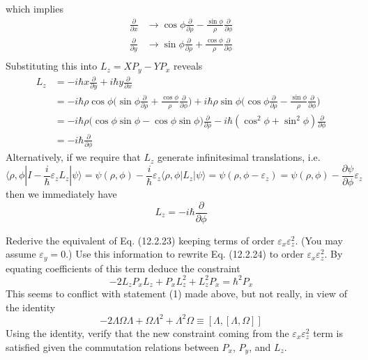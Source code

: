 \documentclass[../principles-of-quantum-mechanics.tex]{subfiles}
\begin{document}
\begin{questions}
\begin{solution}
		which implies
		\begin{align*}
			\frac{\partial}{\partial x} &\to \cos\phi\frac{\partial}{\partial \rho} - \frac{\sin\phi}{\rho}\frac{\partial}{\partial \phi} \\
			\frac{\partial}{\partial y} &\to \sin\phi\frac{\partial}{\partial \rho} + \frac{\cos\phi}{\rho}\frac{\partial}{\partial \phi} \\
		\end{align*}
		Substituting this into $L_z = XP_y - YP_x$ reveals
		\begin{align*}
			L_z &= -i\hbar x\frac{\partial}{\partial y} + i\hbar y\frac{\partial}{\partial x} \\
			&= -i\hbar\rho\cos\phi\Big(\sin\phi\frac{\partial}{\partial \rho} + \frac{\cos\phi}{\rho}\frac{\partial}{\partial \phi}\Big) + i\hbar\rho\sin\phi\Big(\cos\phi\frac{\partial}{\partial \rho} - \frac{\sin\phi}{\rho}\frac{\partial}{\partial \phi}\Big) \\
			&= -i\hbar\rho\Big(\cos\phi\sin\phi - \cos\phi\sin\phi\Big)\frac{\partial}{\partial \rho} - i\hbar(\cos^2\phi + \sin^2\phi)\frac{\partial}{\partial\phi} \\
			&= -i\hbar\frac{\partial}{\partial\phi}
		\end{align*}
		Alternatively, if we require that $L_z$ generate infinitesimal translations, i.e.
		$$\langle \rho, \phi|I - \frac{i}{\hbar}\varepsilon_z L_z|\psi\rangle = \psi(\rho, \phi) - \frac{i}{\hbar}\varepsilon_z\langle\rho,\phi|L_z|\psi\rangle = \psi(\rho, \phi - \varepsilon_z) = \psi(\rho, \phi) - \frac{\partial\psi}{\partial\phi}\varepsilon_z$$
		then we immediately have
		$$L_z = {-i\hbar\frac{\partial}{\partial\phi}}$$
	\end{solution}
	
	\question Rederive the equivalent of Eq. (12.2.23) keeping terms of order $\varepsilon_x\varepsilon_z^2$. (You may assume $\varepsilon_y=0$.) Use this information to rewrite Eq. (12.2.24) to order $\varepsilon_x\varepsilon_z^2$. By equating coefficients of this term deduce the constraint
	$$-2L_zP_xL_z + P_xL_z^2 + L_z^2P_x = \hbar^2P_x$$
	This seems to conflict with statement (1) made above, but not really, in view of the identity
	$$-2\Lambda\Omega\Lambda + \Omega\Lambda^2 + \Lambda^2\Omega \equiv [\Lambda, [\Lambda, \Omega]]$$
	Using the identity, verify that the new constraint coming from the $\varepsilon_x\varepsilon_z^2$ term is satisfied given the commutation relations between $P_x$, $P_y$, and $L_z$.
	

\end{questions}
\end{document}

